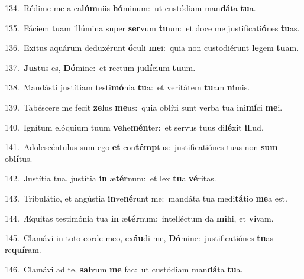 {\numbfont\textcolor{\numbcolor}{134.}}~Rédime me a ca\-\textbf{lúm}\-niis \textbf{hó}\-minum:~\star ut custódiam man\-\textbf{dá}\-ta \textbf{tu}\-a.\par
{\numbfont\textcolor{\numbcolor}{135.}}~Fáciem tuam illúmina super \textbf{ser}\-vum \textbf{tu}\-um:~\star et doce me justificati\-\textbf{ó}\-nes \textbf{tu}\-as.\par
{\numbfont\textcolor{\numbcolor}{136.}}~Exitus aquárum deduxérunt \textbf{ó}\-culi \textbf{me}\-i:~\star quia non custodiérunt \textbf{le}\-gem \textbf{tu}\-am.\par
{\numbfont\textcolor{\numbcolor}{137.}}~\-\textbf{Jus}\-tus es, \textbf{Dó}\-mine:~\star et rectum ju\-\textbf{dí}\-cium \textbf{tu}\-um.\par
{\numbfont\textcolor{\numbcolor}{138.}}~Mandásti justítiam testi\-\textbf{mó}\-nia \textbf{tu}\-a:~\star et veritátem \textbf{tu}\-am \textbf{ni}\-mis.\par
{\numbfont\textcolor{\numbcolor}{139.}}~Tabéscere me fecit \textbf{ze}\-lus \textbf{me}\-us:~\star quia oblíti sunt verba tua ini\-\textbf{mí}\-ci \textbf{me}\-i.\par
{\numbfont\textcolor{\numbcolor}{140.}}~Ignítum elóquium tuum \textbf{ve}\-he\-\textbf{mén}\-ter:~\star et servus tuus di\-\textbf{lé}\-xit \textbf{il}\-lud.\par
{\numbfont\textcolor{\numbcolor}{141.}}~Adolescéntulus sum ego \textbf{et} con\-\textbf{témp}\-tus:~\star justificatiónes tuas non \textbf{sum} ob\-\textbf{lí}\-tus.\par
{\numbfont\textcolor{\numbcolor}{142.}}~Justítia tua, justítia \textbf{in} æ\-\textbf{tér}\-num:~\star et lex \textbf{tu}\-a \textbf{vé}\-ritas.\par
{\numbfont\textcolor{\numbcolor}{143.}}~Tribulátio, et angústia \textbf{in}\-ve\-\textbf{né}\-runt me:~\star mandáta tua medi\-\textbf{tá}\-tio \textbf{me}\-a est.\par
{\numbfont\textcolor{\numbcolor}{144.}}~Æquitas testimónia tua \textbf{in} æ\-\textbf{tér}\-num:~\star intelléctum da \textbf{mi}\-hi, et \textbf{vi}\-vam.\par
{\numbfont\textcolor{\numbcolor}{145.}}~Clamávi in toto corde meo, ex\-\textbf{áu}\-di me, \textbf{Dó}\-mine:~\star justificatiónes \textbf{tu}\-as re\-\textbf{quí}\-ram.\par
{\numbfont\textcolor{\numbcolor}{146.}}~Clamávi ad te, \textbf{sal}\-vum \textbf{me} fac:~\star ut custódiam man\-\textbf{dá}\-ta \textbf{tu}\-a.\par
